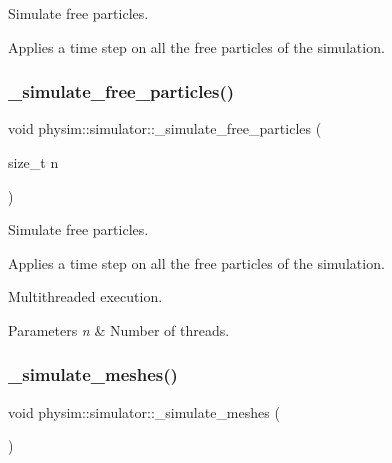 Simulate free particles. 

Applies a time step on all the free particles of the simulation. \mbox{\label{classphysim_1_1simulator_acf1b77beeaf600d40f88d7b91dac80f7}} 
\subsubsection{\texorpdfstring{\+\_\+simulate\+\_\+free\+\_\+particles()}{\_simulate\_free\_particles()}\hspace{0.1cm}{\footnotesize\ttfamily [2/2]}}
{\footnotesize\ttfamily void physim\+::simulator\+::\+\_\+simulate\+\_\+free\+\_\+particles (\begin{DoxyParamCaption}\item[{size\+\_\+t}]{n }\end{DoxyParamCaption})\hspace{0.3cm}{\ttfamily [private]}}



Simulate free particles. 

Applies a time step on all the free particles of the simulation.

Multithreaded execution. 
\begin{DoxyParams}{Parameters}
{\em n} & Number of threads. \\
\hline
\end{DoxyParams}
\mbox{\label{classphysim_1_1simulator_ac598aa9b36e01c8cee937a8f95719cd8}} 
\subsubsection{\texorpdfstring{\+\_\+simulate\+\_\+meshes()}{\_simulate\_meshes()}}
{\footnotesize\ttfamily void physim\+::simulator\+::\+\_\+simulate\+\_\+meshes (\begin{DoxyParamCaption}{ }\end{DoxyParamCaption})\hspace{0.3cm}{\ttfamily [private]}}



